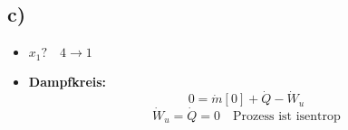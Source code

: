 

\subsection*{c)}
\begin{itemize}
    \item $x_1? \quad 4 \rightarrow 1$
    \item \textbf{Dampfkreis:} 
    \[
    0 = \dot{m} [0] + \dot{Q} - \dot{W}_u
    \]
    \[
    \dot{W}_u = \dot{Q} = 0 \quad \text{Prozess ist isentrop}
    \]
\end{itemize}